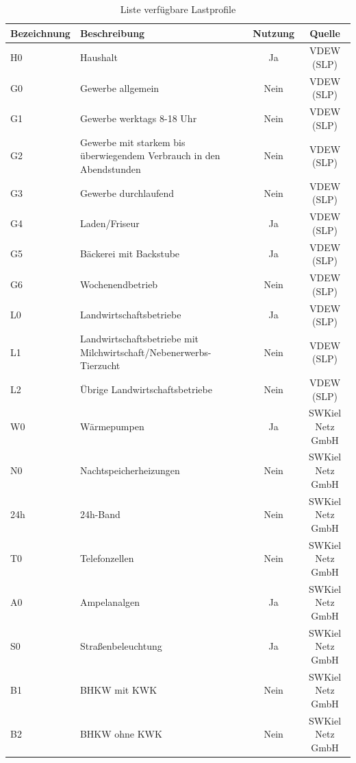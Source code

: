 \begin{table}[htbp]
    \centering
    \caption{Liste verfügbare Lastprofile}
    \label{tab:lastprofile}
    \begin{tabular}{llcc}
        \toprule
        \textbf{Bezeichnung} & \textbf{Beschreibung} & \textbf{Nutzung} & \textbf{Quelle} \\
        \midrule
        H0 & Haushalt & Ja & VDEW (SLP) \\
        G0 & Gewerbe allgemein & Nein & VDEW (SLP) \\
        G1 & Gewerbe werktags 8-18 Uhr & Nein & VDEW (SLP) \\
        G2 & Gewerbe mit starkem bis überwiegendem Verbrauch in den Abendstunden & Nein & VDEW (SLP) \\
        G3 & Gewerbe durchlaufend & Nein & VDEW (SLP) \\
        G4 & Laden/Friseur & Ja & VDEW (SLP) \\
        G5 & Bäckerei mit Backstube & Ja & VDEW (SLP) \\
        G6 & Wochenendbetrieb & Nein & VDEW (SLP) \\
        L0 & Landwirtschaftsbetriebe & Ja & VDEW (SLP) \\
        L1 & Landwirtschaftsbetriebe mit Milchwirtschaft/Nebenerwerbs-Tierzucht & Nein & VDEW (SLP) \\
        L2 & Übrige Landwirtschaftsbetriebe & Nein & VDEW (SLP) \\
        W0 & Wärmepumpen & Ja & SWKiel Netz GmbH \\
        N0 & Nachtspeicherheizungen & Nein & SWKiel Netz GmbH \\
        24h & 24h-Band & Nein & SWKiel Netz GmbH \\
        T0 & Telefonzellen & Nein & SWKiel Netz GmbH \\
        A0 & Ampelanalgen & Ja & SWKiel Netz GmbH \\
        S0 & Straßenbeleuchtung & Ja & SWKiel Netz GmbH \\
        B1 & BHKW mit KWK & Nein & SWKiel Netz GmbH \\
        B2 & BHKW ohne KWK & Nein & SWKiel Netz GmbH \\
        \bottomrule
    \end{tabular}
\end{table}

